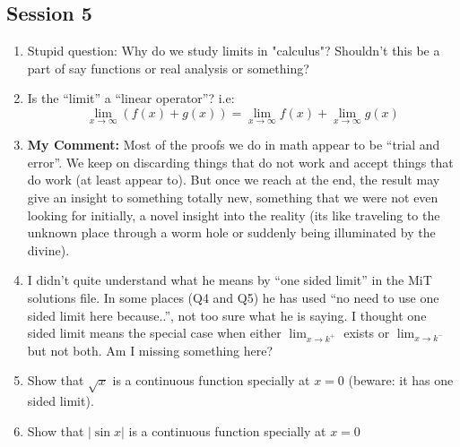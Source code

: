 \documentclass[]{article}
\begin{document}
\subsection{Session 5}

\begin{enumerate}
	\item Stupid question: Why do we study limits in "calculus"? Shouldn't this be a part of say functions or real analysis or something?
	
	\item Is the ``limit'' a ``linear operator''? i.e: 
	$$\lim_{x\to\infty} \left(f(x)+g(x)\right) = \lim_{x\to\infty} f(x) + \lim_{x\to\infty} g(x)$$
	
	\item \textbf{My Comment:} Most of the proofs we do in math appear to be ``trial and error''. We keep on discarding things that do not work and accept things that do work (at least appear to). But once we reach at the end, the result may give an insight to something totally new, something that we were not even looking for initially, a novel insight into the reality (its like traveling to the unknown place through a worm hole or suddenly being illuminated by the divine).
	
	\item I didn't quite understand what he means by ``one sided limit'' in the MiT solutions file. In some places (Q4 and Q5) he has used ``no need to use one sided limit here because..'', not too sure what he is saying. I thought one sided limit means the special case when either $\lim_{x\to k^{+}}$ exists or $\lim_{x\to k^{-}}$ but not both. Am I missing something here?
	
	\item Show that $\sqrt{x}$ is a continuous function specially at $x=0$ (beware: it has one sided limit).
	
	\item Show that $|\sin{x}|$ is a continuous function specially at $x=0$ 
\end{enumerate}
\end{document}
